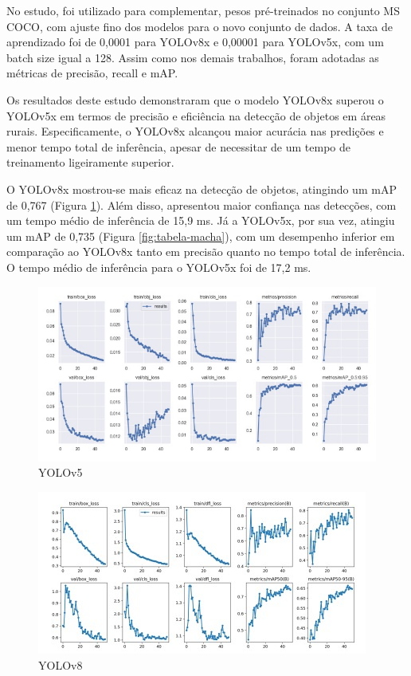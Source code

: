 No estudo, foi utilizado para complementar, pesos pré-treinados no conjunto MS COCO, com ajuste fino dos modelos para o novo conjunto de dados. A taxa de aprendizado foi de 0,0001 para YOLOv8x e 0,00001 para YOLOv5x, com um batch size igual a 128. Assim como nos demais trabalhos, foram adotadas as métricas de precisão, recall e mAP.

Os resultados deste estudo demonstraram que o modelo YOLOv8x superou o YOLOv5x em termos de precisão e eficiência na detecção de objetos em áreas rurais. Especificamente, o YOLOv8x alcançou maior acurácia nas predições e menor tempo total de inferência, apesar de necessitar de um tempo de treinamento ligeiramente superior.

O YOLOv8x mostrou-se mais eficaz na detecção de objetos, atingindo um mAP de 0,767 (Figura \ref{fig:yolov5}). Além disso, apresentou maior confiança nas detecções, com um tempo médio de inferência de 15,9 ms. Já a YOLOv5x, por sua vez, atingiu um mAP de 0,735 (Figura \ref{fig:tabela-macha}), com um desempenho inferior em comparação ao YOLOv8x tanto em precisão quanto no tempo total de inferência. O tempo médio de inferência para o YOLOv5x foi de 17,2 ms.
\begin{figure}[!h]
    \center
    \begin{minipage}{1\linewidth}
        \center
        \captionsetup{justification=centering,margin=0.5cm,font=small}
        \includegraphics[width=0.7\linewidth]{img/cap3/yolov5artigo.jpeg}
        \caption{YOLOv5 \cite{diascomparaccao}}
        \label{fig:yolov5}
    \end{minipage}
\end{figure}

\begin{figure}[!h]
    \center
    \begin{minipage}{1\linewidth}
        \center
        \captionsetup{justification=centering,margin=0.5cm,font=small}
        \includegraphics[width=0.7\linewidth]{img/cap3/yolov8artigo.jpeg}
        \caption{YOLOv8 \cite{diascomparaccao}}
        \label{fig:yolov8}
    \end{minipage}
\end{figure}

